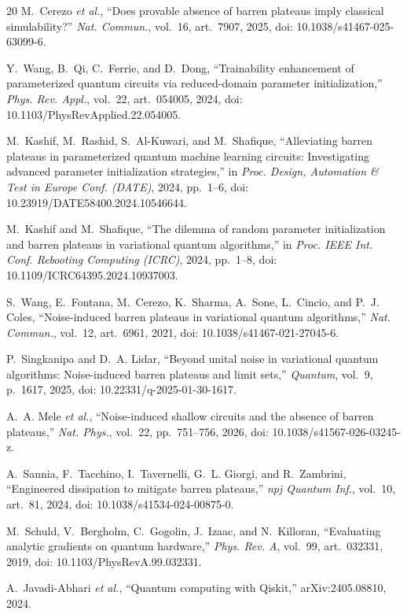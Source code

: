 \documentclass[conference]{IEEEtran}
\begin{document}
\begin{thebibliography}{20}
M.~Cerezo \emph{et al.},
``Does provable absence of barren plateaus imply classical simulability?''
\emph{Nat. Commun.}, vol.~16, art.~7907, 2025, doi: 10.1038/s41467-025-63099-6.

Y.~Wang, B.~Qi, C.~Ferrie, and D.~Dong,
``Trainability enhancement of parameterized quantum circuits via reduced-domain parameter initialization,''
\emph{Phys. Rev. Appl.}, vol.~22, art.~054005, 2024, doi: 10.1103/PhysRevApplied.22.054005.

M.~Kashif, M.~Rashid, S.~Al-Kuwari, and M.~Shafique,
``Alleviating barren plateaus in parameterized quantum machine learning circuits: Investigating advanced parameter initialization strategies,''
in \emph{Proc. Design, Automation \& Test in Europe Conf. (DATE)}, 2024, pp.~1--6, doi: 10.23919/DATE58400.2024.10546644.

M.~Kashif and M.~Shafique,
``The dilemma of random parameter initialization and barren plateaus in variational quantum algorithms,''
in \emph{Proc. IEEE Int. Conf. Rebooting Computing (ICRC)}, 2024, pp.~1--8, doi: 10.1109/ICRC64395.2024.10937003.

S.~Wang, E.~Fontana, M.~Cerezo, K.~Sharma, A.~Sone, L.~Cincio, and P.~J. Coles,
``Noise-induced barren plateaus in variational quantum algorithms,''
\emph{Nat. Commun.}, vol.~12, art.~6961, 2021, doi: 10.1038/s41467-021-27045-6.

P.~Singkanipa and D.~A. Lidar,
``Beyond unital noise in variational quantum algorithms: Noise-induced barren plateaus and limit sets,''
\emph{Quantum}, vol.~9, p.~1617, 2025, doi: 10.22331/q-2025-01-30-1617.

A.~A. Mele \emph{et al.},
``Noise-induced shallow circuits and the absence of barren plateaus,''
\emph{Nat. Phys.}, vol.~22, pp.~751--756, 2026, doi: 10.1038/s41567-026-03245-z.

A.~Sannia, F.~Tacchino, I.~Tavernelli, G.~L. Giorgi, and R.~Zambrini,
``Engineered dissipation to mitigate barren plateaus,''
\emph{npj Quantum Inf.}, vol.~10, art.~81, 2024, doi: 10.1038/s41534-024-00875-0.

M.~Schuld, V.~Bergholm, C.~Gogolin, J.~Izaac, and N.~Killoran,
``Evaluating analytic gradients on quantum hardware,''
\emph{Phys. Rev. A}, vol.~99, art.~032331, 2019, doi: 10.1103/PhysRevA.99.032331.

A.~Javadi-Abhari \emph{et al.},
``Quantum computing with Qiskit,''
arXiv:2405.08810, 2024.
\end{thebibliography}
\end{document}
